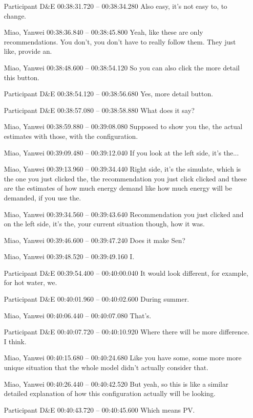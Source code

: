 {Participant D\&E 00:38:31.720 -- 00:38:34.280
Also easy, it's not easy to, to change.

Miao, Yanwei 00:38:36.840 -- 00:38:45.800
Yeah, like these are only recommendations. You don't, you don't have to really follow them. They just like, provide an.

Miao, Yanwei 00:38:48.600 -- 00:38:54.120
So you can also click the more detail this button.

Participant D\&E 00:38:54.120 -- 00:38:56.680
Yes, more detail button.

Participant D\&E 00:38:57.080 -- 00:38:58.880
What does it say?

Miao, Yanwei 00:38:59.880 -- 00:39:08.080
Supposed to show you the, the actual estimates with those, with the configuration.

Miao, Yanwei 00:39:09.480 -- 00:39:12.040
If you look at the left side, it's the...

Miao, Yanwei 00:39:13.960 -- 00:39:34.440
Right side, it's the simulate, which is the one you just clicked the, the recommendation you just click clicked and these are the estimates of how much energy demand like how much energy will be demanded, if you use the.

Miao, Yanwei 00:39:34.560 -- 00:39:43.640
Recommendation you just clicked and on the left side, it's the, your current situation though, how it was.

Miao, Yanwei 00:39:46.600 -- 00:39:47.240
Does it make Sen?

Miao, Yanwei 00:39:48.520 -- 00:39:49.160
I.

Participant D\&E 00:39:54.400 -- 00:40:00.040
It would look different, for example, for hot water, we.

Participant D\&E 00:40:01.960 -- 00:40:02.600
During summer.

Miao, Yanwei 00:40:06.440 -- 00:40:07.080
That's.

Participant D\&E 00:40:07.720 -- 00:40:10.920
Where there will be more difference. I think.

Miao, Yanwei 00:40:15.680 -- 00:40:24.680
Like you have some, some more more unique situation that the whole model didn't actually consider that.

Miao, Yanwei 00:40:26.440 -- 00:40:42.520
But yeah, so this is like a similar detailed explanation of how this configuration actually will be looking.

Participant D\&E 00:40:43.720 -- 00:40:45.600
Which means PV.

}
